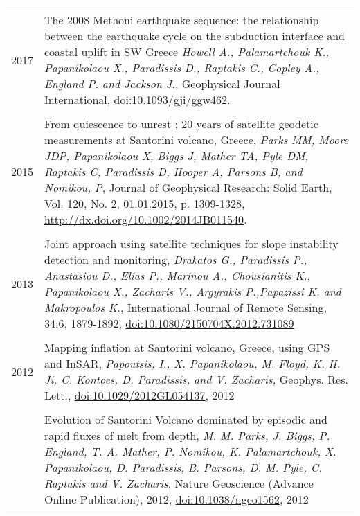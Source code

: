 \documentclass[a4paper,10pt]{article} %
\begin{document}
\begin{longtable}{r|p{14cm}}

\multicolumn{2}{c}{} \\
  \textsc{2017}

  & The 2008 Methoni earthquake sequence: the relationship between the earthquake cycle on the subduction interface and coastal uplift in SW Greece
  \emph{Howell A., Palamartchouk K., Papanikolaou X., Paradissis D., Raptakis C., Copley A., England P. and Jackson J.}, Geophysical Journal International, \href{https://doi.org/10.1093/gji/ggw462}{doi:10.1093/gji/ggw462}.\\

\multicolumn{2}{c}{} \\
  \textsc{2015}

  & From quiescence to unrest : 20 years of satellite geodetic measurements at Santorini volcano, Greece,
  \emph{Parks MM, Moore JDP, Papanikolaou X, Biggs J, Mather TA, Pyle DM, Raptakis C, Paradissis D, Hooper A, Parsons B, and Nomikou, P}, Journal of Geophysical Research: Solid Earth, Vol. 120, No. 2, 01.01.2015, p. 1309-1328, \href{http://dx.doi.org/10.1002/2014JB011540}{http://dx.doi.org/10.1002/2014JB011540}.\\
  
\multicolumn{2}{c}{} \\ 
  \textsc{2013}

  & Joint approach using satellite techniques for slope instability detection and monitoring,
  \emph{Drakatos G., Paradissis P., Anastasiou D., Elias P., Marinou A., Chousianitis K., Papanikolaou X., Zacharis V., Argyrakis P.,Papazissi K. and Makropoulos K.},
  International Journal of Remote Sensing, 34:6, 1879-1892, \href{http://www.tandfonline.com/doi/abs/10.1080/2150704X.2012.731089#.Uxni9meIaig}{doi:10.1080/2150704X.2012.731089}\\

\multicolumn{2}{c}{} \\ 
  \textsc{2012}
  & Mapping inflation at Santorini volcano, Greece, using GPS and InSAR,
  \emph{Papoutsis, I., X. Papanikolaou, M. Floyd, K. H. Ji, C. Kontoes, D. Paradissis, and V. Zacharis,}
  Geophys. Res. Lett., \href{http://www.agu.org/pubs/crossref/pip/2012GL054137.shtml}{doi:10.1029/2012GL054137}, 2012\\

  &\\

  & Evolution of Santorini Volcano dominated by episodic and rapid fluxes of melt from depth,
  \emph{M. M. Parks, J. Biggs, P. England, T. A. Mather, P. Nomikou, K. Palamartchouk, X. Papanikolaou, D. Paradissis, B. Parsons, D. M. Pyle, C. Raptakis and V. Zacharis},
  Nature Geoscience (Advance Online Publication), 2012, \href{http://www.nature.com/ngeo/journal/v5/n10/full/ngeo1562.html}{doi:10.1038/ngeo1562}, 2012\\


\end{longtable}
\end{document}
